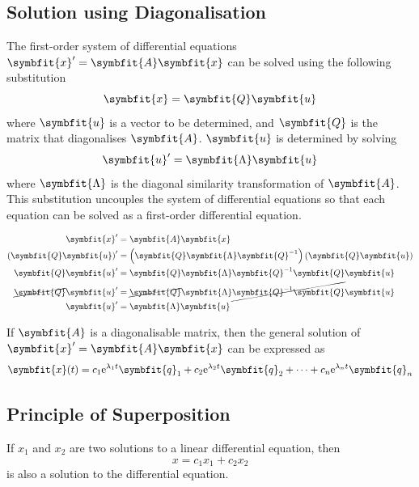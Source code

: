 \documentclass{article}
\begin{document}
	\subsection{Solution using Diagonalisation}
	\begin{theorem}
		The first-order system of differential equations $\symbfit{x}' = \symbfit{A} \symbfit{x}$ can be solved using the following substitution
		\begin{equation*}
			\symbfit{x}=\symbfit{Q}\symbfit{u}
		\end{equation*}
		where $\symbfit{u}$ is a vector to be determined, and $\symbfit{Q}$ is the matrix that diagonalises $\symbfit{A}$. $\symbfit{u}$ is determined by solving
		\begin{equation*}
			\symbfit{u}' = \symbfit{\Lambda} \symbfit{u}
		\end{equation*}
		where $\symbfit{\Lambda}$ is the diagonal similarity transformation of $\symbfit{A}$. This substitution uncouples the system of differential equations so that each equation can be solved as a first-order differential equation.
	\end{theorem}
	\begin{solutionF}[Proof]
		\begingroup 
		\allowdisplaybreaks
		\begin{align*}
			\symbfit{x}' &= \symbfit{A} \symbfit{x} \\
			\left( \symbfit{Q}\symbfit{u} \right)' &= \left( \symbfit{Q}\symbfit{\Lambda} \symbfit{Q}^{-1} \right)\left( \symbfit{Q}\symbfit{u} \right) \\
			\symbfit{Q}\symbfit{u}' &= \symbfit{Q}\symbfit{\Lambda} \symbfit{Q}^{-1} \symbfit{Q}\symbfit{u} \\
			\cancel{\symbfit{Q}}\symbfit{u}' &= \cancel{\symbfit{Q}}\symbfit{\Lambda} \cancel{\symbfit{Q}^{-1} \symbfit{Q}}\symbfit{u} \\
			\symbfit{u}' &= \symbfit{\Lambda} \symbfit{u}
		\end{align*}
		\endgroup
	\end{solutionF}
	\begin{theorem}
		If $\symbfit{A}$ is a diagonalisable matrix, then the general solution of $\symbfit{x}' = \symbfit{A} \symbfit{x}$ can be expressed as
		\begin{equation*}
			\symbfit{x}(t) = c_1 \e^{\lambda_1 t} \symbfit{q}_1 + c_2 \e^{\lambda_2 t} \symbfit{q}_2 + \cdots + c_n \e^{\lambda_n t} \symbfit{q}_n
		\end{equation*}
	\end{theorem}
	\subsection{Principle of Superposition}
	\begin{theorem}
		If $x_1$ and $x_2$ are two solutions to a linear differential equation, then
		\begin{equation*}
			x = c_1 x_1 + c_2 x_2
		\end{equation*}
		is also a solution to the differential equation.
	\end{theorem}
\end{document}
